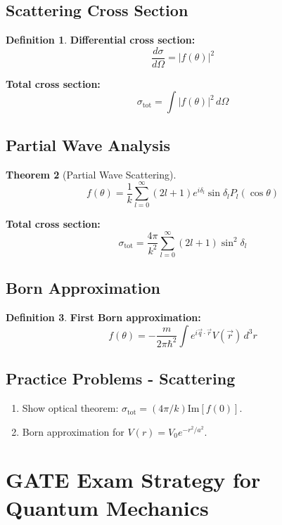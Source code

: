 \documentclass[12pt,a4paper]{article}
\theoremstyle{definition}
\newtheorem{theorem}{Theorem}[section]
\newtheorem{definition}[theorem]{Definition}
\begin{document}
\subsection{Scattering Cross Section}

\begin{definition}
\textbf{Differential cross section:}
\[
\frac{d\sigma}{d\Omega} = |f(\theta)|^2
\]

\textbf{Total cross section:}
\[
\sigma_{\text{tot}} = \int |f(\theta)|^2\,d\Omega
\]
\end{definition}

\subsection{Partial Wave Analysis}

\begin{theorem}[Partial Wave Scattering]
\[
f(\theta) = \frac{1}{k}\sum_{l=0}^{\infty} (2l + 1)e^{i\delta_l}\sin\delta_l P_l(\cos\theta)
\]

\textbf{Total cross section:}
\[
\sigma_{\text{tot}} = \frac{4\pi}{k^2}\sum_{l=0}^{\infty} (2l + 1)\sin^2\delta_l
\]
\end{theorem}

\subsection{Born Approximation}

\begin{definition}
\textbf{First Born approximation:}
\[
f(\theta) = -\frac{m}{2\pi\hbar^2}\int e^{i\vec{q} \cdot \vec{r}} V(\vec{r})\,d^3r
\]
\end{definition}

\subsection{Practice Problems - Scattering}

\begin{enumerate}
    \item Show optical theorem: $\sigma_{\text{tot}} = (4\pi/k)\text{Im}[f(0)]$.
    \item Born approximation for $V(r) = V_0 e^{-r^2/a^2}$.
\end{enumerate}

\newpage
\section{GATE Exam Strategy for Quantum Mechanics}
\end{document}
